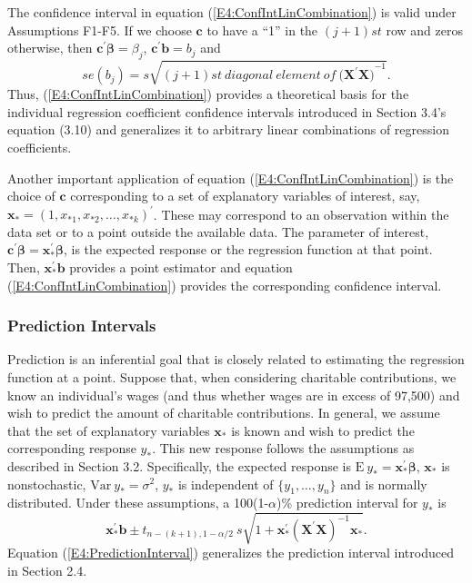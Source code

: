 The confidence interval in equation (\ref{E4:ConfIntLinCombination})
is valid under Assumptions F1-F5. If we choose $\mathbf{c}$ to have
a ``1'' in the $(j+1)st$ row and zeros otherwise, then
$\mathbf{c}^{\prime}\boldsymbol \beta =\beta _{j}$,
$\mathbf{c}^{\prime}\mathbf{b=}b_{j}$ and
\begin{equation*}
se(b_{j})=s\sqrt{
(j+1)st~diagonal~element~of~(\mathbf{X^{\prime}X)}^{-1}}.
\end{equation*} Thus, (\ref{E4:ConfIntLinCombination}) provides a
theoretical basis for the individual regression coefficient
confidence intervals introduced in Section 3.4's equation (3.10) and
generalizes it to arbitrary linear combinations of regression
coefficients.

Another important application of equation
(\ref{E4:ConfIntLinCombination}) is the choice of $\mathbf{c}$
corresponding to a set of explanatory variables of interest, say,
$\mathbf{x}_{\ast}=\left( 1,x_{\ast 1},x_{\ast 2},\ldots,x_{\ast k}
\right)^{\prime}$. These may correspond to an observation within the
data set or to a point outside the available data. The parameter of
interest, $\mathbf{c}^{\prime} \boldsymbol \beta =
\mathbf{x}_{\ast}^{\prime} \boldsymbol \beta $, is the expected
response or the regression function at that point. Then,
$\mathbf{x}_{\ast}^{\prime} \mathbf{b}$ provides a point estimator
and equation (\ref{E4:ConfIntLinCombination}) provides the
corresponding confidence interval.

\subsubsection*{Prediction Intervals}

Prediction is an inferential goal that is closely related to
estimating the regression function at a point. Suppose that, when
considering charitable contributions, we know an individual's wages
(and thus whether wages are in excess of 97,500) and wish to predict
the amount of charitable contributions. In general, we assume that
the set of explanatory variables $\mathbf{x}_{\ast}$ is known and
wish to predict the corresponding response $y_{\ast}$. This new
response follows the assumptions as described in Section 3.2.
Specifically, the expected response is $\mathrm{E~}y_{\ast}=
\mathbf{x}_{\ast}^{\prime} \boldsymbol \beta $, $\mathbf{x}_{\ast}$
is nonstochastic, $\mathrm{Var~}y_{\ast}=\sigma^2$, $y_{\ast}$ is
independent of $\{y_1,\ldots,y_{n}\}$ and is normally distributed.
Under these assumptions, a 100(1-$\alpha $)\% prediction interval
for $y_{\ast}$ is
\begin{equation}\label{E4:PredictionInterval}
\mathbf{x}_{\ast}^{\prime} \mathbf{b} \pm t_{n-(k+1),1-\alpha /2} ~s
\sqrt{1 + \mathbf{x}_{\ast}^{\prime} ( \mathbf{X}^{\prime}\mathbf{X}
)^{-1} \mathbf{x}_{\ast}}.
\end{equation}
Equation (\ref{E4:PredictionInterval}) generalizes the prediction
interval introduced in Section 2.4.


